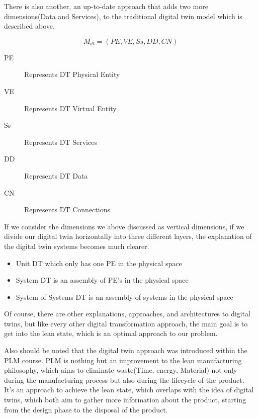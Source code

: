 \documentclass[9pt,conference]{IEEEtran}
\begin{document}
    There is also another, an up-to-date approach that adds two more dimensions(Data and Services), to the traditional digital twin model which is described above.~\cite{DTGRIEVES}

    \begin{equation}
        M_{dt} = (PE,VE,Ss,DD,CN)
    \end{equation}

    \begin{description}
        \item[PE] Represents DT Physical Entity
        \item[VE] Represents DT Virtual Entity
        \item[Ss] Represents DT Services
        \item[DD] Represents DT Data
        \item[CN] Represents DT Connections
    \end{description}
    If we consider the dimensions we above discussed as vertical dimensions, if we divide our digital twin horizontally into three different layers, the explanation of the digital twin systems becomes much clearer.
    \begin{itemize}
        \item Unit DT which only has one PE in the physical space
        \item System DT  is an assembly of PE's in the physical space
        \item System of Systems DT  is an assembly of systems in the physical space
    \end{itemize} 

    Of course, there are other explanations, approaches, and architectures to digital twins, but like every other digital transformation approach, the main goal is to get into the lean state,
    which is an optimal approach to our problem. 
    
    Also should be noted that the digital twin approach was introduced within the PLM course. PLM is nothing but an improvement to the lean manufacturing philosophy, which aims to eliminate waste(Time, energy, Material) not only during the
    manufacturing process but also during the lifecycle of the product.~\cite{grieves2006PLM} 
    It's an approach to achieve the lean state, which overlaps with the idea of digital twins, which both aim to gather more information about the product, starting from the design phase to the disposal of the product.
    
\end{document}
